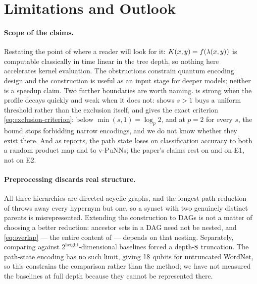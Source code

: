 \section{Limitations and Outlook}
\label{sec:limitations}

\paragraph{Scope of the claims.}
Restating the point of  where a reader will look for it:
$K(x,y) = f(\lambda(x,y))$ is computable classically in time linear in the tree depth,
so nothing here accelerates kernel evaluation. The obstructions constrain quantum
encoding design and the construction is useful as an input stage for deeper models;
neither is a speedup claim. Two further boundaries are worth naming.
 is strong when the profile decays quickly and weak when it
does not:  shows $s > 1$ buys a uniform threshold rather than the
exclusion itself, and gives the exact criterion \cref{eq:exclusion-criterion}: below
$\min(s,1) = \log_p 2$, and at $p = 2$ for every $s$, the bound stops forbidding narrow
encodings, and we do not know whether they exist there. And as  reports, the path state loses on classification
accuracy to both a random product map and to v-PuNNs; the paper's claims rest on
 and on E1, not on E2.

\paragraph{Preprocessing discards real structure.}
All three hierarchies are directed acyclic graphs, and the longest-path reduction of
 throws away every hypernym but one, so a synset with two genuinely
distinct parents is misrepresented. Extending the construction to DAGs is not a matter
of choosing a better reduction: ancestor sets in a DAG need not be nested, and
\cref{eq:overlap} --- the entire content of  --- depends on that
nesting. Separately, comparing against $2^{\text{height}}$-dimensional baselines forced
a depth-$8$ truncation. The path-state encoding has no such limit,  giving
$18$ qubits for untruncated WordNet, so this constrains the
comparison rather than the method; we have not measured the baselines at full depth
because they cannot be represented there.

